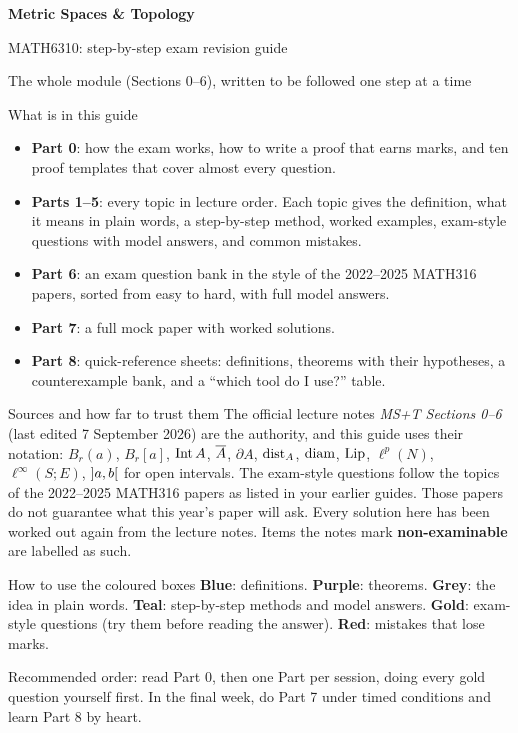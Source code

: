 \documentclass[11pt]{article}
\begin{document}
\begin{titlepage}
\vspace*{14mm}
{\Huge\bfseries\color{navy} Metric Spaces \& Topology\par}
\vspace{4mm}
{\LARGE MATH6310: step-by-step exam revision guide\par}
\vspace{6mm}
{\large The whole module (Sections 0--6), written to be followed one step at a time\par}
\vspace{2mm}{\large Prepared for Sai Vanam, 2026/27\par}
\vspace{10mm}
\begin{note}{What is in this guide}
\begin{itemize}
\item \textbf{Part 0}: how the exam works, how to write a proof that earns marks, and ten
  proof templates that cover almost every question.
\item \textbf{Parts 1--5}: every topic in lecture order. Each topic gives the definition, what it
  means in plain words, a step-by-step method, worked examples, exam-style questions with model
  answers, and common mistakes.
\item \textbf{Part 6}: an exam question bank in the style of the 2022--2025 MATH316 papers,
  sorted from easy to hard, with full model answers.
\item \textbf{Part 7}: a full mock paper with worked solutions.
\item \textbf{Part 8}: quick-reference sheets: definitions, theorems with their hypotheses,
  a counterexample bank, and a ``which tool do I use?'' table.
\end{itemize}
\end{note}
\begin{note}{Sources and how far to trust them}
The official lecture notes \emph{MS+T Sections 0--6} (last edited 7 September 2026) are the
authority, and this guide uses their notation: $B_r(a)$, $B_r[a]$, $\operatorname{Int} A$, $\overline{A}$,
$\partial A$, $\operatorname{dist}_A$, $\operatorname{diam}$, $\operatorname{Lip}$, $\ell^p(N)$, $\ell^\infty(S;E)$, $\mathopen{]}a,b\mathclose{[}$ for open
intervals. The exam-style questions follow the topics of the 2022--2025 MATH316 papers as listed
in your earlier guides. Those papers do not guarantee what this year's paper will ask.
Every solution here has been worked out again from the lecture notes.
Items the notes mark \textbf{non-examinable} are labelled as such.
\end{note}
\begin{note}{How to use the coloured boxes}
\textbf{Blue}: definitions. \textbf{Purple}: theorems. \textbf{Grey}: the idea in plain words.
\textbf{Teal}: step-by-step methods and model answers. \textbf{Gold}: exam-style questions (try
them before reading the answer). \textbf{Red}: mistakes that lose marks.
\end{note}
\vfill
{\small Recommended order: read Part 0, then one Part per session, doing every gold question
yourself first. In the final week, do Part 7 under timed conditions and learn Part 8 by heart.}
\end{titlepage}
\tableofcontents\clearpage










\end{document}
